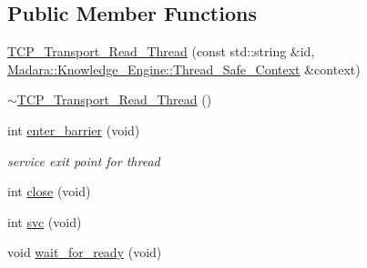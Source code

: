 \subsection*{Public Member Functions}
\begin{DoxyCompactItemize}
\item 
\hyperlink{classMadara_1_1Transport_1_1TCP__Transport__Read__Thread_ac7b50e1391d65b1496eef3700c71d257}{TCP\_\-Transport\_\-Read\_\-Thread} (const std::string \&id, \hyperlink{classMadara_1_1Knowledge__Engine_1_1Thread__Safe__Context}{Madara::Knowledge\_\-Engine::Thread\_\-Safe\_\-Context} \&context)
\item 
\hyperlink{classMadara_1_1Transport_1_1TCP__Transport__Read__Thread_aee67bc79335a7aa365f660d9db0226f9}{$\sim$TCP\_\-Transport\_\-Read\_\-Thread} ()
\item 
int \hyperlink{classMadara_1_1Transport_1_1TCP__Transport__Read__Thread_a25a2b4b9f3786e6d776c3d2b30d378c6}{enter\_\-barrier} (void)
\begin{DoxyCompactList}\small\item\em service exit point for thread \item\end{DoxyCompactList}\item 
int \hyperlink{classMadara_1_1Transport_1_1TCP__Transport__Read__Thread_a019085313f541a88f2e83545cb58ade4}{close} (void)
\item 
int \hyperlink{classMadara_1_1Transport_1_1TCP__Transport__Read__Thread_afeca9d48531686cb85a2514002f68a06}{svc} (void)
\item 
void \hyperlink{classMadara_1_1Transport_1_1TCP__Transport__Read__Thread_a30aabf460778f9c3fb8fc8a2a7dc9c42}{wait\_\-for\_\-ready} (void)
\end{DoxyCompactItemize}
